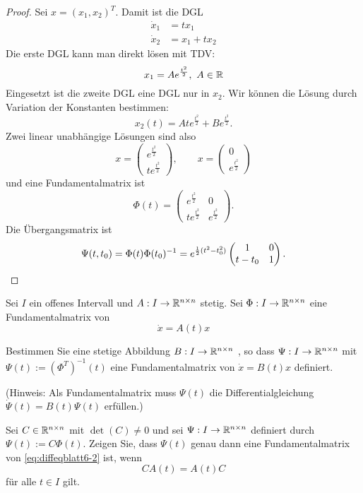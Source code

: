 \begin{proof}
	Sei $x=(x_1,x_2)^T$. Damit ist die DGL
	\begin{align*}
		\dot{x}_1 &= t x_1\\
		\dot{x}_2 &= x_1 + t x_2
	\end{align*}
	Die erste DGL kann man direkt l\"{o}sen mit TDV:
	\[x_1 = Ae^{\frac{t^2}{2}},~A\in \mathbb{R}\]
	Eingesetzt ist die zweite DGL eine DGL nur in $x_2$. Wir k\"{o}nnen die L\"{o}sung durch Variation der Konstanten bestimmen:
	\[x_2(t)=At e^{\frac{t^2}{2}}+B e^{\frac{t^2}{2}}.\]
	Zwei linear unabhängige Lösungen sind also
	\[x=\begin{pmatrix}
		e^{\frac{t^2}{2}} \\ t e^{\frac{t^2}{2}}
	\end{pmatrix},\qquad x=\begin{pmatrix}
	0 \\ e^{\frac{t^2}{2}}
\end{pmatrix}\]
und eine Fundamentalmatrix ist
\[\Phi(t) = \begin{pmatrix}
	e^{\frac{t^2}{2}} & 0\\ t e^{\frac{t^2}{2}} &  e^{\frac{t^2}{2}}
\end{pmatrix}.\]
Die Übergangsmatrix ist
\[\Psi(t,t_0) = \Phi(t)\Phi(t_0)^{-1}=e^{\frac 12 (t^2-t_0^2)}\begin{pmatrix}
	1 & 0 \\
	t-t_0 & 1
\end{pmatrix}.\qedhere\]
\end{proof}
\begin{Problem}
	Sei $I$ ein offenes Intervall und $A: I\to \mathbb{R}^{n\times n}$ stetig. Sei $\Phi: I\to \mathbb{R}^{n\times n}$ eine Fundamentalmatrix von 
	\begin{equation}\label{eq:diffeqblatt6-2}
		\dot{x}=A(t)x
	\end{equation}
	\begin{parts}
		\item Bestimmen Sie eine stetige Abbildung $B : I \to \mathbb{R}^{n\times n}$ , so dass $\Psi : I \to \mathbb{R}^{n\times n}$ mit $\Psi(t) := (\Phi^T)^{-1}(t)$ eine Fundamentalmatrix von $\dot{x} = B(t)x$ definiert.
			
			(Hinweis: Als Fundamentalmatrix muss $\Psi(t)$ die Differentialgleichung $\dot{\Psi}(t) = B(t)\Psi(t)$ erfüllen.)
			\item Sei $C \in \mathbb{R}^{n\times n}$ mit $\det(C) \neq 0$ und sei $\Psi : I \to \mathbb{R}^{n\times n}$ definiert durch $\Psi(t) := C\Phi(t)$. Zeigen Sie, dass $\Psi(t)$ genau dann eine Fundamentalmatrix von \eqref{eq:diffeqblatt6-2} ist, wenn
			\[CA(t)=A(t)C\]
			f\"{u}r alle $t\in I$ gilt.
	\end{parts}
\end{Problem}
